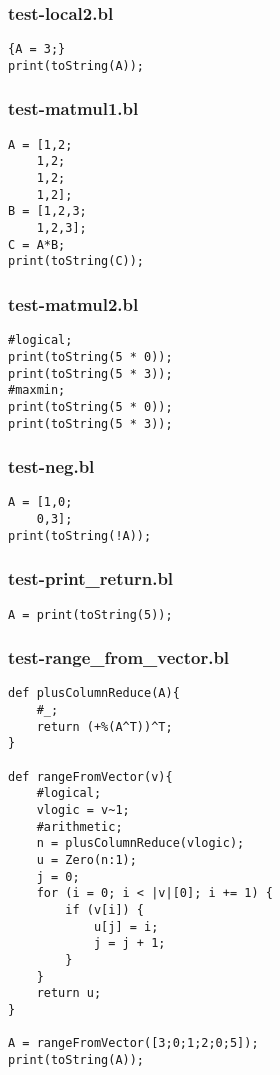 \subsubsection{test-local2.bl}
\begin{lstlisting}
{A = 3;}
print(toString(A));
\end{lstlisting}
\subsubsection{test-matmul1.bl}
\begin{lstlisting}
A = [1,2;
    1,2;
    1,2;
    1,2];
B = [1,2,3;
    1,2,3];
C = A*B;
print(toString(C));

\end{lstlisting}
\subsubsection{test-matmul2.bl}
\begin{lstlisting}
#logical;
print(toString(5 * 0));
print(toString(5 * 3));
#maxmin;
print(toString(5 * 0));
print(toString(5 * 3));
\end{lstlisting}
\subsubsection{test-neg.bl}
\begin{lstlisting}
A = [1,0;
    0,3];
print(toString(!A));
\end{lstlisting}
\subsubsection{test-print\_return.bl}
\begin{lstlisting}
A = print(toString(5));
\end{lstlisting}
\subsubsection{test-range\_from\_vector.bl}
\begin{lstlisting}
def plusColumnReduce(A){
    #_;
    return (+%(A^T))^T;
}

def rangeFromVector(v){
    #logical;
    vlogic = v~1;
    #arithmetic;
    n = plusColumnReduce(vlogic);
    u = Zero(n:1);
    j = 0;
    for (i = 0; i < |v|[0]; i += 1) {
        if (v[i]) {
            u[j] = i;
            j = j + 1;
        }
    }
    return u;
}

A = rangeFromVector([3;0;1;2;0;5]);
print(toString(A));
\end{lstlisting}
